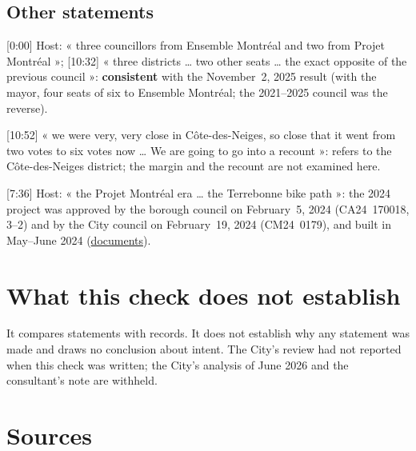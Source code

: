 \documentclass[11pt,letterpaper]{article}
\newcommand{\repourl}{https://github.com/OpenMobilityData/Terrebonne-open-sources}
\newcommand{\doc}[2]{\href{\repourl/blob/main/#1}{#2}}
\newcommand{\cliptime}[1]{\textsf{\small[#1]}}
\begin{document}
\subsection{Other statements}

\cliptime{0:00} Host: « three councillors from Ensemble Montréal and two from
Projet Montréal »; \cliptime{10:32} « three districts … two other seats … the
exact opposite of the previous council »: \textbf{consistent} with the
November~2, 2025 result (with the mayor, four seats of six to Ensemble
Montréal; the 2021--2025 council was the reverse).

\cliptime{10:52} « we were very, very close in Côte-des-Neiges, so close that
it went from two votes to six votes now … We are going to go into a
recount »: refers to the Côte-des-Neiges district; the margin and the recount
are not examined here.

\cliptime{7:36} Host: « the Projet Montréal era … the Terrebonne bike path »:
the 2024 project was approved by the borough council on February~5, 2024
(CA24~170018, 3--2) and by the City council on February~19, 2024 (CM24~0179),
and built in May--June 2024 (\doc{2024-project-approval/}{documents}).

\section{What this check does not establish}

It compares statements with records. It does not establish why any statement
was made and draws no conclusion about intent. The City's review had not
reported when this check was written; the City's analysis of June 2026 and the
consultant's note are withheld.

\section{Sources}
\end{document}
